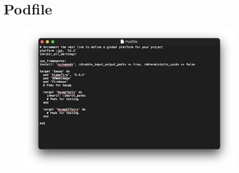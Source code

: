 \chapter{Podfile}\label{app:A}
\label{app:appendixA}


\begin{figure}[h]
    \centering
    \includegraphics[scale=0.9]{figures/iOS/ios5.png}
    \label{fig:appendix1}
\end{figure}
















